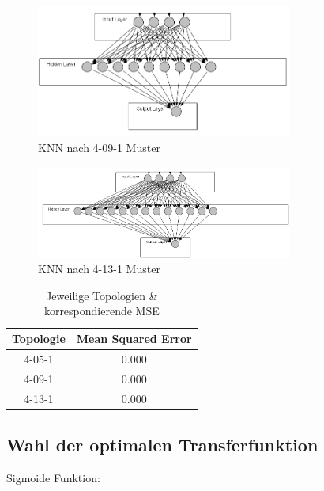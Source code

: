 \begin{figure}
\centering
		\includegraphics[width=0.75\textwidth]{4-9-1.PNG}
	\caption{KNN nach 4-09-1 Muster}
	\label{fig:KNN nach 4-09-1 Muster}
\end{figure}



\begin{figure}[htbp]
\centering
		\includegraphics[width=0.75\textwidth]{4-13-1.PNG}
	\caption{KNN nach 4-13-1 Muster}
	\label{fig:KNN nach 4-13-1 Muster}
\end{figure}


\begin{table}
  \centering
  \begin{tabular}{|c|c|}
  \hline 
  \rule[0ex]{0pt}{2.5ex} Topologie & Mean Squared Error \\ 
  \hline 
  \rule[0ex]{0pt}{2.5ex} 4-05-1 & 0.000 \\ 
  \hline 
  \rule[0ex]{0pt}{2.5ex} 4-09-1 & 0.000 \\ 
  \hline 
  \rule[0ex]{0pt}{2.5ex} 4-13-1 & 0.000 \\ 
  \hline 
  \end{tabular} 
  \caption{Jeweilige Topologien \& korrespondierende MSE}
  \label{tab:myfirsttable}
\end{table}


\subsection{Wahl der optimalen Transferfunktion} %

Sigmoide Funktion:

